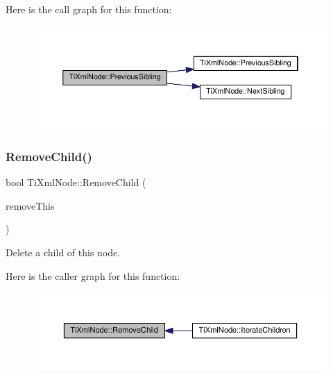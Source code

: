 Here is the call graph for this function\+:
\nopagebreak
\begin{figure}[H]
\begin{center}
\leavevmode
\includegraphics[width=350pt]{class_ti_xml_node_a6c977049207177ef21b51972315c2053_cgraph}
\end{center}
\end{figure}
\mbox{\label{class_ti_xml_node_ae19d8510efc90596552f4feeac9a8fbf}} 
\subsubsection{\texorpdfstring{Remove\+Child()}{RemoveChild()}}
{\footnotesize\ttfamily bool Ti\+Xml\+Node\+::\+Remove\+Child (\begin{DoxyParamCaption}\item[{\hyperlink{class_ti_xml_node}{Ti\+Xml\+Node} $\ast$}]{remove\+This }\end{DoxyParamCaption})}



Delete a child of this node. 

Here is the caller graph for this function\+:
\nopagebreak
\begin{figure}[H]
\begin{center}
\leavevmode
\includegraphics[width=350pt]{class_ti_xml_node_ae19d8510efc90596552f4feeac9a8fbf_icgraph}
\end{center}
\end{figure}
\mbox{\label{class_ti_xml_node_a543208c2c801c84a213529541e904b9f}} 
